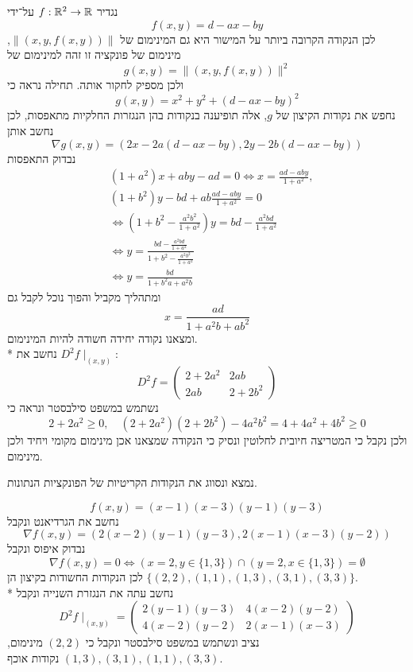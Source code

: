נגדיר $f : \mathbb{R}^2 \to \mathbb{R}$ על־ידי
\[
	f(x, y) = d - ax - by
\]
לכן הנקודה הקרובה ביותר על המישור היא גם המינימום של $\lVert (x, y, f(x, y)) \rVert$, מינימום של פונקציה זו זהה למינימום של
\[
	g(x, y) = \lVert (x, y, f(x, y)) \rVert^2
\]
ולכן מספיק לחקור אותה.
תחילה נראה כי
\[
	g(x, y) = x^2 + y^2 + {(d - ax - by)}^2
\]
נחפש את נקודות הקיצון של $g$, אלה תופיענה בנקודות בהן הנגזרות החלקיות מתאפסות, לכן נחשב אותן
\[
	\nabla g (x, y) = (2x - 2a(d - ax - by), 2y - 2b(d - ax - by) )
\]
נבדוק התאפסות
\begin{align*}
	& (1 + a^2) x + ab y - ad = 0
	\iff x = \frac{ad - ab y}{1 + a^2}, \\
	& (1 + b^2) y - bd + ab \frac{ad - aby}{1 + a^2} = 0 \\
	& \iff (1 + b^2 - \frac{a^2b^2}{1 + a^2}) y = bd - \frac{a^2bd}{1 + a^2} \\
	& \iff y = \frac{bd - \frac{a^2bd}{1 + a^2}}{1 + b^2 - \frac{a^2b^2}{1 + a^2}} \\
	& \iff y = \frac{bd}{1 + b^2a + a^2b}
\end{align*}
ומתהליך מקביל והפוך נוכל לקבל גם
\[
	x = \frac{ad}{1 + a^2b + ab^2}
\]
ומצאנו נקודה יחידה חשודה להיות המינימום. \\*
נחשב את $D^2 f \mid_{(x, y)}$:
\[
	D^2 f = 
	\begin{pmatrix}
		2 + 2a^2 & 2ab \\
		2ab & 2 + 2b^2
	\end{pmatrix}
\]
נשתמש במשפט סילבסטר ונראה כי
\[
	2 + 2a^2 \ge 0,
	\quad
	(2 + 2a^2)(2 + 2b^2) - 4a^2b^2 = 4 + 4a^2 + 4b^2 \ge 0
\]
ולכן נקבל כי המטריצה חיובית לחלוטין ונסיק כי הנקודה שמצאנו אכן מינימום מקומי ויחיד ולכן מינימום.

\Question{}
נמצא ונסווג את הנקודות הקריטיות של הפונקציות הנתונות.

\Subquestion{}
\[
	f(x, y) = (x - 1)(x - 3)(y - 1)(y - 3)
\]
נחשב את הגרדיאנט ונקבל
\[
	\nabla f(x, y) = (2(x - 2)(y - 1)(y - 3), 2(x - 1)(x - 3)(y - 2))
\]
נבדוק איפוס ונקבל
\[
	\nabla f(x, y) = 0 \iff (x = 2, y \in \{1, 3\}) \cap (y = 2, x \in \{1, 3\}) = \emptyset
\]
לכן הנקודות החשודות בקיצון הן $\{ (2, 2), (1, 1), (1, 3), (3, 1), (3, 3) \}$. \\*
נחשב עתה את הנגזרת השנייה ונקבל
\[
	D^2 f \mid_{(x, y)}
	= \begin{pmatrix}
		2(y - 1)(y - 3) & 4(x - 2)(y - 2) \\
		4(x - 2)(y - 2) & 2(x - 1)(x - 3)
	\end{pmatrix}
\]
נציב ונשתמש במשפט סילבסטר ונקבל כי $(2, 2)$ מינימום, $(1, 3), (3, 1), (1, 1), (3, 3)$ נקודות אוכף.

